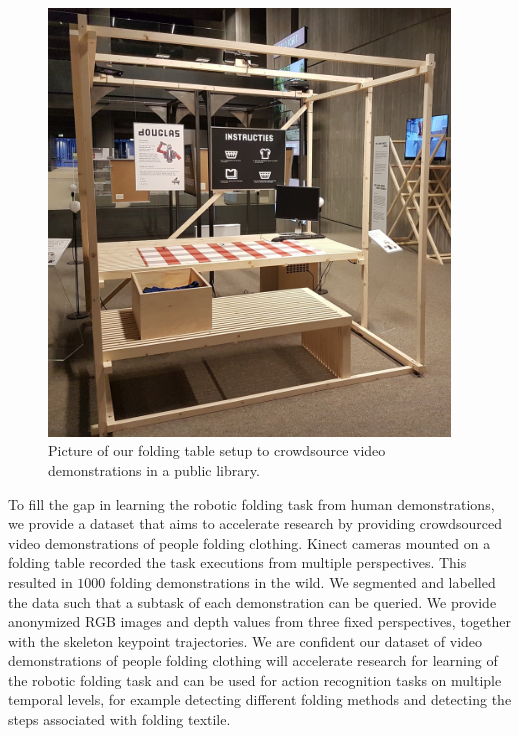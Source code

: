 \documentclass[\home/main.tex]{subfiles}
\begin{document}
\begin{figure}[htpb]
    \centering
    \includegraphics[width=0.95\textwidth,keepaspectratio]{figures/douglas_empty} 
    \caption{Picture of our folding table setup to crowdsource video demonstrations in a public library. } %
    \label{fig:douglas}
  \end{figure}
  
  To fill the gap in learning the robotic folding task from human demonstrations, we provide a dataset that aims to accelerate research by providing crowdsourced video demonstrations of people folding clothing. Kinect cameras mounted on a folding table recorded the task executions from multiple perspectives. This resulted in $1000$ folding demonstrations in the wild. We segmented and labelled the data such that a subtask of each demonstration can be queried. We provide anonymized RGB images and depth values from three fixed perspectives, together with the skeleton keypoint trajectories. We are confident our dataset of video demonstrations of people folding clothing will accelerate research for learning of the robotic folding task and can be used for action recognition tasks on multiple temporal levels, for example detecting different folding methods and detecting the steps associated with folding textile.
\end{document}
